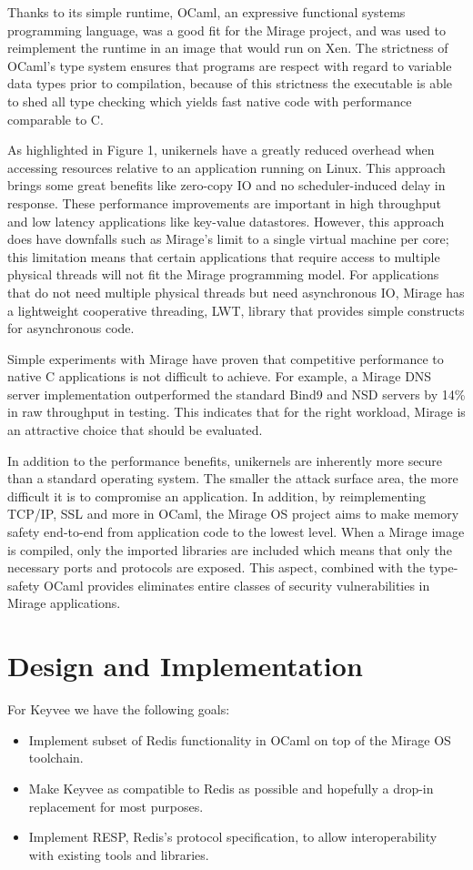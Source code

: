 \documentclass[english,10pt,twocolumn]{article}
\begin{document}
Thanks to its simple runtime, OCaml, an expressive functional systems programming language, was a good fit for the Mirage project, and was used to re\-implement the runtime in an image that would run on Xen.
The strictness of OCaml's type system ensures that programs are respect with regard to variable data types prior to compilation, because of this strictness the executable is able to shed all type checking which yields fast native code with performance comparable to C.

As highlighted in Figure 1, unikernels have a greatly reduced overhead when accessing resources relative to an application running on Linux.
This approach brings some great benefits like zero-copy IO and no scheduler-induced delay in response.
These performance improvements are important in high throughput and low latency applications like key-value datastores.
However, this approach does have downfalls such as Mirage's limit to a single virtual machine per core; this limitation means that certain applications that require access to multiple physical threads will not fit the Mirage programming model.
For applications that do not need multiple physical threads but need asynchronous IO, Mirage has a lightweight cooperative threading, LWT, library that provides simple constructs for asynchronous code.

Simple experiments with Mirage have proven that competitive performance to native C applications is not difficult to achieve.
For example, a Mirage DNS server implementation outperformed the standard Bind9 and NSD servers by 14\% in raw throughput in testing.
This indicates that for the right workload, Mirage is an attractive choice that should be evaluated.

In addition to the performance benefits, unikernels are inherently more secure than a standard operating system.
The smaller the attack surface area, the more difficult it is to compromise an application.
In addition, by reimplementing TCP/IP, SSL and more in OCaml, the Mirage OS project aims to make memory safety end-to-end from application code to the lowest level.
When a Mirage image is compiled, only the imported libraries are included which means that only the necessary ports and protocols are exposed.
This aspect, combined with the type-safety OCaml provides eliminates entire classes of security vulnerabilities in Mirage applications.





\section{Design and Implementation}
For Keyvee we have the following goals:
\begin{itemize}
  \item Implement subset of Redis functionality in OCaml on top of the Mirage OS toolchain.
  \item Make Keyvee as compatible to Redis as possible and hopefully a drop-in replacement for most purposes.
  \item Implement RESP, Redis's protocol specification, to allow interoperability with existing tools and libraries.
\end{itemize}
\end{document}

